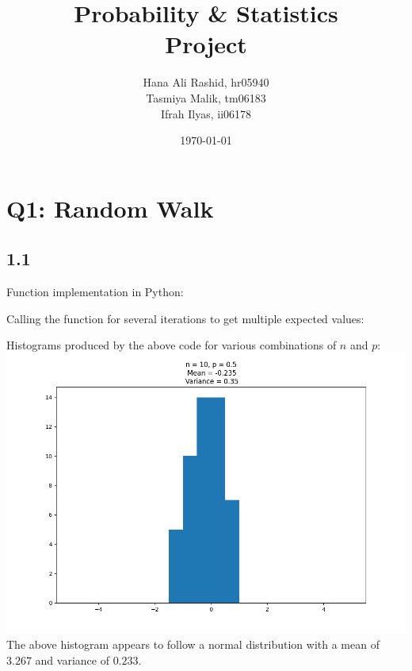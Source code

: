 \documentclass[answers]{exam}
\title{Probability \& Statistics\\ Project}
\author{Hana Ali Rashid, hr05940\\ Tasmiya Malik, tm06183\\ Ifrah Ilyas, ii06178}
\date{\today{}}
\begin{document}
\maketitle



\section*{Q1: Random Walk}
\subsection*{1.1}
Function implementation in Python:

Calling the function for several iterations to get multiple expected values:

\pagebreak
Histograms produced by the above code for various combinations of $n$ and $p$:\\
\includegraphics[scale = 0.5]{Q1/1.1/q1_n = 10_ p = 0.5.png}\\
The above histogram appears to follow a normal distribution with a mean of $3.267$ and variance of $0.233$.\\
\end{document}
